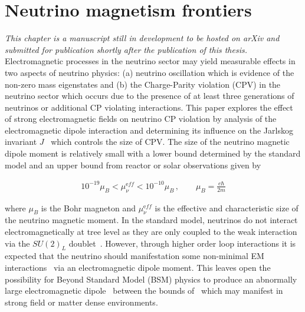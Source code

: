 \chapter{Neutrino magnetism frontiers}
\label{chap:neutrino}
\noindent \emph{This chapter is a manuscript still in development to be hosted on arXiv and submitted for publication shortly after the publication of this thesis.}\\

\noindent Electromagnetic processes in the neutrino sector may yield measurable effects in two aspects of neutrino physics: (a) neutrino oscillation which is evidence of the non-zero mass eigenstates and (b) the Charge-Parity violation (CPV) in the neutrino sector which occurs due to the presence of at least three generations of neutrinos or additional CP violating interactions. This paper explores the effect of strong electromagnetic fields on neutrino CP violation by analysis of the electromagnetic dipole interaction and determining its influence on the Jarlskog invariant $J$~\citep{jarlskog1985basis,jarlskog1985commutator,jarlskog2005invariants} which controls the size of CPV. The size of the neutrino magnetic dipole moment is relatively small with a lower bound determined by the standard model and an upper bound from reactor or solar observations given by~\citep{alexander2016status,canas2016updating,sierra2022neutrino}

\begin{align}
    \label{momentbound:1}
    10^{-19}\mu_{B}<\mu_{\nu}^{\mathrm eff}<10^{-10}\mu_{B}\,,\qquad\mu_{B}=\frac{e\hbar}{2m}
\end{align}

where $\mu_{B}$ is the Bohr magneton and $\mu_{\nu}^{\mathrm eff}$ is the effective and characteristic size of the neutrino magnetic moment. In the standard model, neutrinos do not interact electromagnetically at tree level as they are only coupled to the weak interaction via the $SU(2)_{L}$ doublet~\citep{schwartz2014quantum}. However, through higher order loop interactions it is expected that the neutrino should manifestation some non-minimal EM interactions~\citep{shrock1980new,abi2021prospects} via an electromagnetic dipole moment. This leaves open the possibility for Beyond Standard Model (BSM) physics to produce an abnormally large electromagnetic dipole~\citep{giunti2015neutrino,lindner2017revisiting,brdar2021neutrino} between the bounds of~ which may manifest in strong field or matter dense environments.

